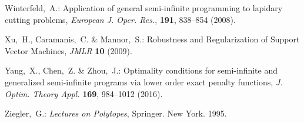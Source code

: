 \documentclass{amsart}
\theoremstyle{plain}
\numberwithin{equation}{section}
\begin{document}
\begin{thebibliography}{100}
			Winterfeld,~A.: 
			Application of general semi-infinite programming to lapidary cutting problems, 
			{\em European J. Oper. Res.}, \textbf{191}, 838--854 (2008).
			
			Xu,~H., Caramanis,~C. \& Mannor,~S.: 
			Robustness and Regularization of Support Vector Machines, 
			{\em JMLR} \textbf{10} (2009).
			
			Yang,~X., Chen,~Z. \& Zhou,~J.: 
			Optimality conditions for semi-infinite and generalized semi-infinite programs via lower order exact penalty functions, 
			{\em J. Optim. Theory Appl.} \textbf{169}, 984--1012 (2016).
			
			
			Ziegler,~G.:
			\emph{Lectures on Polytopes}, Springer. New York. 1995.
			
		\end{thebibliography}
		
	
\end{document}
